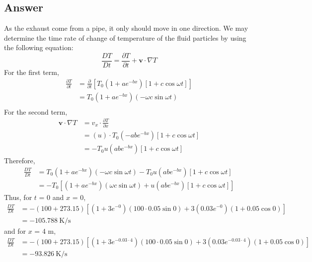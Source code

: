 \documentclass{article}
\begin{document}
\subsection*{Answer}
As the exhaust come from a pipe, it only should move in one direction. We may determine the time rate of change of temperature of the fluid particles by using the following equation:
\begin{equation}
    \frac{DT}{Dt} = \frac{\partial T}{\partial t} + \mathbf{v} \cdot \nabla T
\end{equation}
For the first term,
\begin{align*}
    \frac{\partial T}{\partial t} &= \frac{\partial}{\partial t} \left[T_0 \left(1 + ae^{-bx}\right)\left[1 + c \cos{\omega t}\right]\right] \\
    &= T_0 \left(1 + ae^{-bx}\right)\left(-\omega c \sin{\omega t}\right) \\
\end{align*}
For the second term,
\begin{align*}
    \mathbf{v} \cdot \nabla T &= v_x \cdot \frac{\partial T}{\partial x} \\
    &= (u) \cdot T_0 \left(-abe^{-bx} \right)\left[1 + c \cos{\omega t}\right] \\
    &= -T_0 u \left(abe^{-bx} \right)\left[1 + c \cos{\omega t}\right]
\end{align*}
Therefore,
\begin{align*}
    \frac{DT}{Dt} &= T_0 \left(1 + ae^{-bx}\right)\left(-\omega c \sin{\omega t}\right) - T_0 u \left(abe^{-bx} \right)\left[1 + c \cos{\omega t}\right] \\
    &= -T_0 \left[\left(1 + ae^{-bx}\right)\left(\omega c \sin{\omega t}\right) + u \left(abe^{-bx} \right)\left[1 + c \cos{\omega t}\right]\right]
\end{align*}
Thus, for $t$ = 0 and $x$ = 0,
\begin{align*}
    \frac{DT}{Dt} &= -(100 + 273.15) [(1 + 3e^{-0}) (100 \cdot 0.05 \sin{0}) + 3 \left(0.03e^{-0} \right) \left(1 + 0.05 \cos{0}\right)] \\
    &= -105.788\ \textrm{K/s}
\end{align*}
and for $x$ = 4 m,
\begin{align*}
    \frac{DT}{Dt} &= -(100 + 273.15) [(1 + 3e^{-0.03 \cdot 4}) (100 \cdot 0.05 \sin{0}) + 3 \left(0.03e^{-0.03 \cdot 4} \right) \left(1 + 0.05 \cos{0}\right)] \\
    &= -93.826\ \textrm{K/s}
\end{align*}
\end{document}
